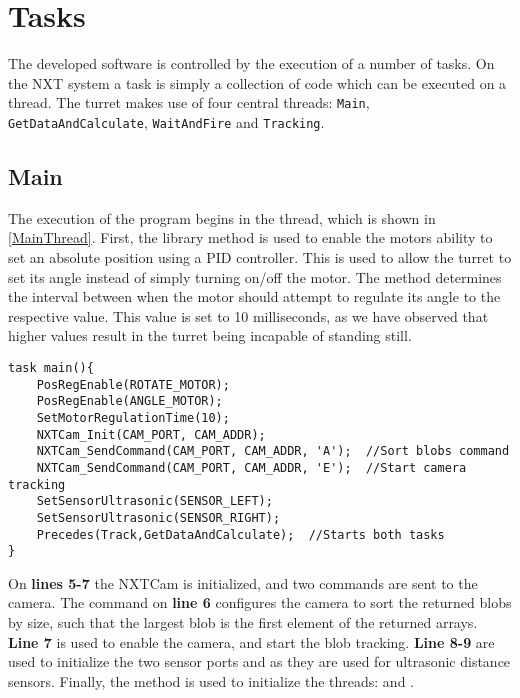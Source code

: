 \section{Tasks}
The developed software is controlled by the execution of a number of
tasks. On the NXT system a task is simply a collection of code which can be
executed on a thread. The turret makes use of four central threads:
\texttt{Main}, \texttt{GetDataAndCalculate}, \texttt{WaitAndFire} and
\texttt{Tracking}.

\subsection{Main}
The execution of the program begins in the  thread, which is shown
in \autoref{MainThread}. First, the library method
 is used to enable the motors ability to set
an absolute position using a PID controller. This is used to allow the turret to
set its angle instead of simply turning on/off the motor.
The  method determines the interval between when
the motor should attempt to regulate its angle to the respective value. This
value is set to 10 milliseconds, as we have observed that higher values result
in the turret being incapable of standing still.

\begin{minipage}[H]{\linewidth}
\begin{lstlisting}[caption = Entry point for the program execution., label = MainThread] 
task main(){
    PosRegEnable(ROTATE_MOTOR);
    PosRegEnable(ANGLE_MOTOR);
    SetMotorRegulationTime(10);
    NXTCam_Init(CAM_PORT, CAM_ADDR);
    NXTCam_SendCommand(CAM_PORT, CAM_ADDR, 'A');  //Sort blobs command
    NXTCam_SendCommand(CAM_PORT, CAM_ADDR, 'E');  //Start camera tracking
    SetSensorUltrasonic(SENSOR_LEFT);
    SetSensorUltrasonic(SENSOR_RIGHT);
    Precedes(Track,GetDataAndCalculate);  //Starts both tasks
}
\end{lstlisting}
\end{minipage}

On \textbf{lines 5-7} the NXTCam is initialized, and two commands are
sent to the camera. The command on \textbf{line 6} configures the camera
to sort the returned blobs by size, such that the largest blob is the first
element of the returned arrays. \textbf{Line 7} is used to enable the camera,
and start the blob tracking. \textbf{Line 8-9} are used to
initialize the two sensor ports  and
 as they are used for ultrasonic distance sensors.
Finally, the  method is used to initialize the
threads:  and .
